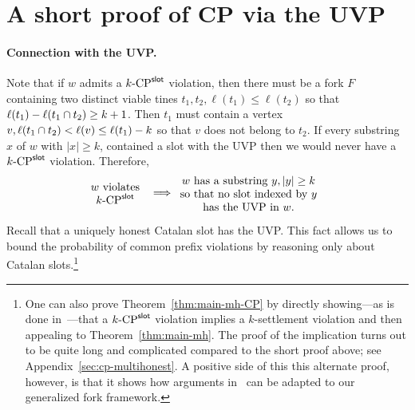 \section{A short proof of CP via the UVP }\label{sec:cp-proof-via-uvp}

  \paragraph{Connection with the UVP.}
  Note that 
  if $w$ admits a ${k}\text{-}\mathrm{CP}^{\mathsf{slot}}$ violation, 
  then there must be a fork $F$ containing 
  two distinct viable tines $t_1, t_2, \ell(t_1) \leq \ell(t_2)$ 
  so that $\ell(t_1) - \ell(t_1 \cap t_2) \geq k + 1$. 
  Then $t_1$ must contain a vertex $v, \ell(t_1 \cap t_2) < \ell(v) \leq \ell(t_1) - k$ 
  so that $v$ does not belong to $t_2$. 
  If every substring $x$ of $w$ with $|x| \geq k$, contained a slot with the UVP then 
  we would never have a ${k}\text{-}\mathrm{CP}^{\mathsf{slot}}$ violation. 
  Therefore, 
  \begin{align}\label{eq:cp-uvp}
    \parbox{20mm}{\centering $w$ violates $\kSlotCP$}
    &\implies
    \parbox{45mm}{\centering
      $w$ has a substring $y, |y| \geq k$ so that 
      no slot indexed by $y$ has the UVP in $w$.
    }
  \end{align}


  Recall that a uniquely honest Catalan slot has the UVP. 
  This fact allows us to bound 
  the probability of common prefix violations by 
  reasoning only about Catalan slots.\footnote{ 
  One can also prove Theorem~\ref{thm:main-mh-CP} 
  by 
  directly showing---as is done in~\cite{LinearConsistency}---that 
  a ${k}\text{-}\mathrm{CP}^{\mathsf{slot}}$ violation implies a $k$-settlement violation 
  and then appealing to Theorem~\ref{thm:main-mh}. 
  The proof of the implication 
  turns out to be quite long and complicated 
  compared to the short proof above; 
  see Appendix~\ref{sec:cp-multihonest}.
  A positive side of this this alternate proof, however,  
  is that it shows how arguments in~\cite{LinearConsistency} 
  can be adapted to our generalized fork framework.
  }

